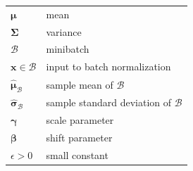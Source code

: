 \begin{customTableWrapper}{1.5}
\begin{longtable}{l p{8cm}}
    $\boldsymbol{\mu}$ & mean \\
    $\boldsymbol{\Sigma}$ & variance \\
    $\mathcal{B}$ & minibatch \\
    $\mathbf{x} \in \mathcal{B}$ & input to batch normalization \\
    $\hat{\boldsymbol{\mu}}_\mathcal{B}$ & sample mean of $\mathcal{B}$ \\
    $\hat{\boldsymbol{\sigma}}_\mathcal{B}$ & sample standard deviation of $\mathcal{B}$ \\
    $\boldsymbol{\gamma}$ & scale parameter \\
    $\boldsymbol{\beta}$ & shift parameter \\
    $\epsilon > 0$ & small constant \\
\end{longtable}
\end{customTableWrapper}


